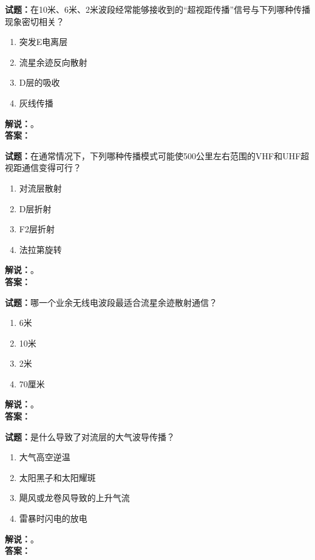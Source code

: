 \documentclass{ctexbook}
\begin{document}
\vspace{\baselineskip}

\noindent\textbf{试题：}在10米、6米、2米波段经常能够接收到的“超视距传播”信号与下列哪种传播现象密切相关？
\begin{enumerate}[leftmargin=3em]
  \item 突发E电离层
  \item 流星余迹反向散射
  \item D层的吸收
  \item 灰线传播
\end{enumerate}
\noindent\textbf{解说：}\textbf{}。\\\noindent\textbf{答案：}

\vspace{\baselineskip}

\noindent\textbf{试题：}在通常情况下，下列哪种传播模式可能使500公里左右范围的VHF和UHF超视距通信变得可行？
\begin{enumerate}[leftmargin=3em]
  \item 对流层散射
  \item D层折射
  \item F2层折射
  \item 法拉第旋转
\end{enumerate}
\noindent\textbf{解说：}\textbf{}。\\\noindent\textbf{答案：}

\vspace{\baselineskip}

\noindent\textbf{试题：}哪一个业余无线电波段最适合流星余迹散射通信？
\begin{enumerate}[leftmargin=3em]
  \item 6米
  \item 10米
  \item 2米
  \item 70厘米
\end{enumerate}
\noindent\textbf{解说：}\textbf{}。\\\noindent\textbf{答案：}

\vspace{\baselineskip}

\noindent\textbf{试题：}是什么导致了对流层的大气波导传播？
\begin{enumerate}[leftmargin=3em]
  \item 大气高空逆温
  \item 太阳黑子和太阳耀斑
  \item 飓风或龙卷风导致的上升气流
  \item 雷暴时闪电的放电
\end{enumerate}
\noindent\textbf{解说：}\textbf{}。\\\noindent\textbf{答案：}
\end{document}

